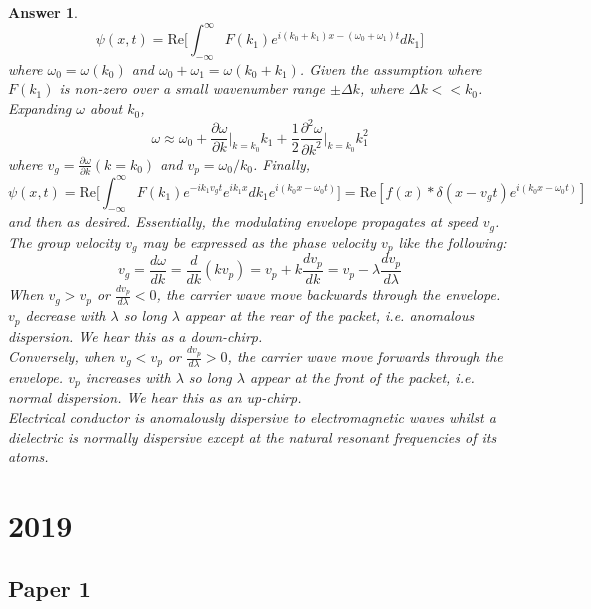 \documentclass[a4paper]{article}
\newtheorem{ans}{Answer}[subsection]
\theoremstyle{new}
\begin{document}
\begin{ans}
$$\psi(x,t)=\text{Re}\bigg[\int_{-\infty}^\infty F(k_1)e^{i(k_0+k_1)x-(\omega_0+\omega_1)t}dk_1\bigg]$$
where $\omega_0=\omega(k_0)$ and $\omega_0+\omega_1=\omega(k_0+k_1)$. Given the assumption where $F(k_1)$ is non-zero over a small wavenumber range $\pm\Delta k$, where $\Delta k<<k_0$. Expanding $\omega$ about $k_0$,
$$\omega\approx\omega_0+\frac{\partial\omega}{\partial k}\bigg|_{k=k_0}k_1+\frac{1}{2}\frac{\partial^2\omega}{\partial k^2}\bigg|_{k=k_0}k_1^2$$
where $v_g=\frac{\partial\omega}{\partial k}(k=k_0)$ and $v_p=\omega_0/k_0$. Finally,
$$\psi(x,t)=\text{Re}\bigg[\int_{-\infty}^\infty F(k_1)e^{-ik_1v_gt}e^{ik_1x}dk_1e^{i(k_0x-\omega_0t)}\bigg]=\text{Re}[f(x)*\delta(x-v_gt)e^{i(k_0x-\omega_0t)}]$$
and then as desired. Essentially, the modulating envelope propagates at speed $v_g$. The group velocity $v_g$ may be expressed as the phase velocity $v_p$ like the following:
$$v_g=\frac{d\omega}{d k}=\frac{d}{dk}(kv_p)=v_p+k\frac{dv_p}{dk}=v_p-\lambda\frac{dv_p}{d\lambda}$$
When $v_g>v_p$ or $\frac{dv_p}{d\lambda}<0$, the carrier wave move backwards through the envelope. $v_p$ decrease with $\lambda$ so long $\lambda$ appear at the rear of the packet, i.e. anomalous dispersion. We hear this as a down-chirp.\\[5pt]
Conversely, when $v_g<v_p$ or $\frac{dv_p}{d\lambda}>0$, the carrier wave move forwards through the envelope. $v_p$ increases with $\lambda$ so long $\lambda$ appear at the front of the packet, i.e. normal dispersion. We hear this as an up-chirp.\\[5pt]
Electrical conductor is anomalously dispersive to electromagnetic waves whilst a dielectric is normally dispersive except at the natural resonant frequencies of its atoms.
\end{ans}
\newpage
\section{2019}
\subsection{Paper 1}
\end{document}
